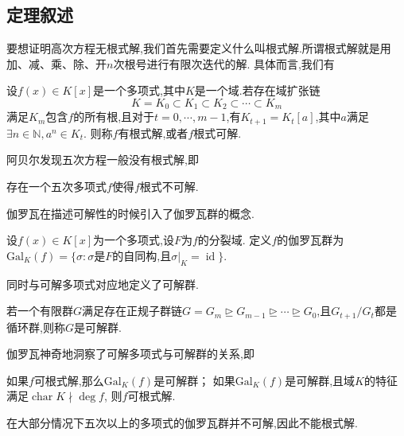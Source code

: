 \documentclass[main]{subfiles}
\newcommand{\gal}{\mathrm{Gal}}
\newcommand{\id}{\mathop{\mathrm{id}}}
\renewcommand{\char}{\mathop{\mathrm{char}}}
\begin{document}
\subsection{定理叙述}
要想证明高次方程无根式解,我们首先需要定义什么叫根式解.所谓根式解就是用加、减、乘、除、开\(n\)次根号进行有限次迭代的解.
具体而言,我们有
\begin{defination}\label{def:1}
	设\(f( x) \in K[ x]\)是一个多项式,其中\(K\)是一个域.若存在域扩张链
	\[
		K=K_0 \subset K_1 \subset K_2 \subset \cdots \subset K_m
	\]
	满足\(K_m\)包含\(f\)的所有根,且对于\(t=0,\cdots,m-1\),有\(K_{t+1}=K_t[ a]\),其中\(a\)满足\(\exists n \in \mathbb{N},a^n \in K_t\).
	则称\(f\)有根式解,或者\(f\)根式可解.
\end{defination}
阿贝尔发现五次方程一般没有根式解,即
\begin{theorem}\label{the:1}
	存在一个五次多项式\(f\)使得\(f\)根式不可解.
\end{theorem}
伽罗瓦在描述可解性的时候引入了伽罗瓦群的概念.
\begin{defination}\label{def:2}
	设\(f( x) \in K[ x]\)为一个多项式,设\(F\)为\(f\)的分裂域.
	定义\(f\)的伽罗瓦群为\(\gal_K( f)=\{ \sigma :\sigma \text{是}F \text{的自同构,且}\sigma|_K=\id\}\).
\end{defination}
同时与可解多项式对应地定义了可解群.
\begin{defination}\label{def:3}
	若一个有限群\(G\)满足存在正规子群链\(G=G_m \unrhd G_{m-1} \unrhd \cdots \unrhd G_0\),且\(G_{t+1} / G_t\)都是循环群,则称\(G\)是可解群.
\end{defination}
伽罗瓦神奇地洞察了可解多项式与可解群的关系,即
\begin{theorem}\label{the:2}
	如果\(f\)可根式解,那么\(\gal_K( f)\)是可解群；
	如果\(\gal_K( f)\)是可解群,且域\(K\)的特征满足\(\char K \nmid \deg f\), 则\(f\)可根式解.
\end{theorem}
在大部分情况下五次以上的多项式的伽罗瓦群并不可解,因此不能根式解.
\end{document}
